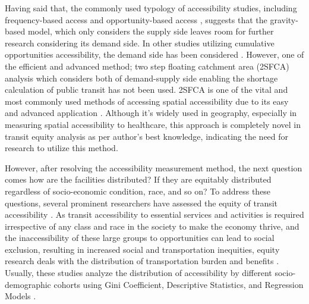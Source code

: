 \documentclass[numbered]{trbunofficial}
\begin{document}
Having said that, the commonly used typology of accessibility studies, including frequency-based access and opportunity-based access \cite{Xavier2021}, suggests that the gravity-based model, which only considers the supply side leaves room for further research considering its demand side.  In other studies utilizing cumulative opportunities accessibility, the demand side has been considered \cite{Ermagun2020,NazariAdli2019}. However, one of the efficient and advanced method; two step floating catchment area (2SFCA) analysis which considers both of demand-supply side enabling the shortage calculation of public transit has not been used. 2SFCA is one of the vital and most commonly used methods of accessing spatial accessibility due to its easy and advanced application \cite{Tao2020}. Although it’s widely used in geography, especially in measuring spatial accessibility to healthcare, this approach is completely novel in transit equity analysis as per author’s best knowledge, indicating the need for research to utilize this method.
 
However, after resolving the accessibility measurement method, the next question comes how are the facilities distributed? If they are equitably distributed regardless of socio-economic condition, race, and so on? To address these questions, several prominent researchers have assessed the equity of transit accessibility \cite{Ermagun2020,Jang2017,Karner2018,NazariAdli2019,Xavier2021}.  As transit accessibility to essential services and activities is required irrespective of any class and race in the society to make the economy thrive, and the inaccessibility of these large groups to opportunities can lead to social exclusion, resulting in increased social and transportation inequities, equity research deals with the distribution of transportation burden and benefits \cite{Bierbaum2021,Karner2018,Lucas2012}.  Usually, these studies analyze the distribution of accessibility by different socio-demographic cohorts using Gini Coefficient, Descriptive Statistics, and Regression Models \cite{NazariAdli2019,Xavier2021}.
\end{document}
